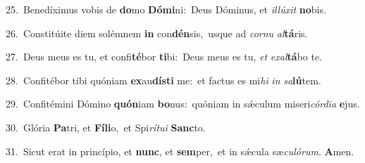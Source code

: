 {\numbfont\textcolor{\numbcolor}{25.}}~Benedíximus vobis de \textbf{do}\-mo \textbf{Dó}\-\textbf{mi}ni:~\star Deus Dóminus, et \textit{il}\-\textit{lú}\textit{xit} \textbf{no}\-bis.\par
{\numbfont\textcolor{\numbcolor}{26.}}~Constitúite diem solémnem \textbf{in} con\-\textbf{dén}\-sis,~\star usque ad \textit{cor}\-\textit{nu} \textit{al}\-\textbf{tá}ris.\par
{\numbfont\textcolor{\numbcolor}{27.}}~Deus meus es tu, et confi\-\textbf{té}\-bor \textbf{ti}\-bi:~\star Deus meus es tu, \textit{et} \textit{ex}\-\textit{al}\textbf{tá}bo te.\par
{\numbfont\textcolor{\numbcolor}{28.}}~Confitébor tibi quóniam \textbf{ex}\-au\-\textbf{dís}\-\textbf{ti} me:~\star et factus es mi\textit{hi} \textit{in} \textit{sa}\-\textbf{lú}tem.\par
{\numbfont\textcolor{\numbcolor}{29.}}~Confitémini Dómino \textbf{quón}\-iam \textbf{bo}\-nus:~\star quóniam in sǽculum miseri\-\textit{cór}\-\textit{di}\textit{a} \textbf{e}\-jus.\par
{\numbfont\textcolor{\numbcolor}{30.}}~Glória \textbf{Pa}\-tri, et \textbf{Fí}\-\textbf{li}o,~\star et Spi\-\textit{rí}\-\textit{tu}\textit{i} \textbf{Sanc}\-to.\par
{\numbfont\textcolor{\numbcolor}{31.}}~Sicut erat in princípio, et \textbf{nunc}\-, et \textbf{sem}\-per,~\star et in sǽcula sæ\-\textit{cu}\-\textit{ló}\textit{rum}. \textbf{A}\-men.\par
